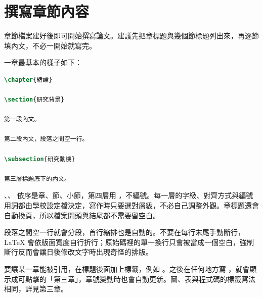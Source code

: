 \section{撰寫章節內容}

章節檔案建好後即可開始撰寫論文。建議先把章標題與幾個節標題列出來，再逐節填內文，不必一開始就寫完。

一章最基本的樣子如下：

\begin{lstlisting}[language=latex]
\chapter{緒論}

\section{研究背景}

第一段內文。

第二段內文，段落之間空一行。

\subsection{研究動機}

第三層標題底下的內文。
\end{lstlisting}

\code{\chapter}、\code{\section}、\code{\subsection} 依序是章、節、小節，第四層用 \code{\subsubsection}，不編號。每一層的字級、對齊方式與編號用詞都由學校設定檔決定，寫作時只要選對層級，不必自己調整外觀。章標題還會自動換頁，所以檔案開頭與結尾都不需要留空白。

段落之間空一行就會分段，首行縮排也是自動的。不要在每行末尾手動斷行，\LaTeX{} 會依版面寬度自行折行；原始碼裡的單一換行只會被當成一個空白，強制斷行反而會讓日後修改文字時出現奇怪的排版。

要讓某一章能被引用，在標題後面加上標籤，例如 。之後在任何地方寫 \code{\ref{cha:method}}，就會顯示成可點擊的「第三章」，章號變動時也會自動更新。圖、表與程式碼的標籤寫法相同，詳見第三章。

